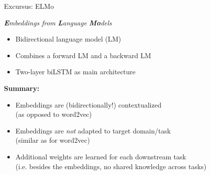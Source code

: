 
\begin{frame}{Excursus: ELMo}

\vfill

\textit{\textbf{E}mbeddings from \textbf{L}anguage \textbf{Mo}dels}

\vspace{.5cm}

	\begin{itemize}
		\item Bidirectional language model (LM)
		\item Combines a forward LM and a backward LM
		\item Two-layer biLSTM as main architecture
	\end{itemize}

	\textbf{Summary:}

	\begin{itemize}
		\item Embeddings are (bidirectionally!) contextualized \\
					(as opposed to word2vec)
		\item Embeddings are \textit{not} adapted to target domain/task \\
					(similar as for word2vec)
		\item Additional weights are learned for each downstream task \\
					(i.e. besides the embeddings, no shared knowledge across tasks)
	\end{itemize}

\vfill

\end{frame}


